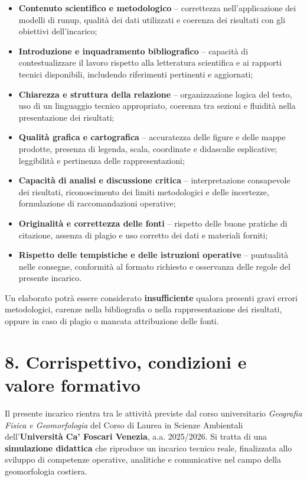 \documentclass[11pt,a4paper,roman]{moderncv}
\begin{document}
\begin{itemize}
  \item \textbf{Contenuto scientifico e metodologico} – correttezza nell’applicazione dei modelli di runup, qualità dei dati utilizzati e coerenza dei risultati con gli obiettivi dell’incarico;
  \item \textbf{Introduzione e inquadramento bibliografico} – capacità di contestualizzare il lavoro rispetto alla letteratura scientifica e ai rapporti tecnici disponibili, includendo riferimenti pertinenti e aggiornati;
  \item \textbf{Chiarezza e struttura della relazione} – organizzazione logica del testo, uso di un linguaggio tecnico appropriato, coerenza tra sezioni e fluidità nella presentazione dei risultati;
  \item \textbf{Qualità grafica e cartografica} – accuratezza delle figure e delle mappe prodotte, presenza di legenda, scala, coordinate e didascalie esplicative; leggibilità e pertinenza delle rappresentazioni;
  \item \textbf{Capacità di analisi e discussione critica} – interpretazione consapevole dei risultati, riconoscimento dei limiti metodologici e delle incertezze, formulazione di raccomandazioni operative;
  \item \textbf{Originalità e correttezza delle fonti} – rispetto delle buone pratiche di citazione, assenza di plagio e uso corretto dei dati e materiali forniti;
  \item \textbf{Rispetto delle tempistiche e delle istruzioni operative} – puntualità nelle consegne, conformità al formato richiesto e osservanza delle regole del presente incarico.
\end{itemize}

Un elaborato potrà essere considerato \textbf{insufficiente} qualora presenti gravi errori metodologici, carenze nella bibliografia o nella rappresentazione dei risultati, oppure in caso di plagio o mancata attribuzione delle fonti.

\section*{8. Corrispettivo, condizioni e valore formativo}
Il presente incarico rientra tra le attività previste dal corso universitario \textit{Geografia Fisica e Geomorfologia} del Corso di Laurea in Scienze Ambientali dell’\textbf{Università Ca’ Foscari Venezia}, a.a. 2025/2026.  
Si tratta di una \textbf{simulazione didattica} che riproduce un incarico tecnico reale, finalizzata allo sviluppo di competenze operative, analitiche e comunicative nel campo della geomorfologia costiera.
\end{document}
